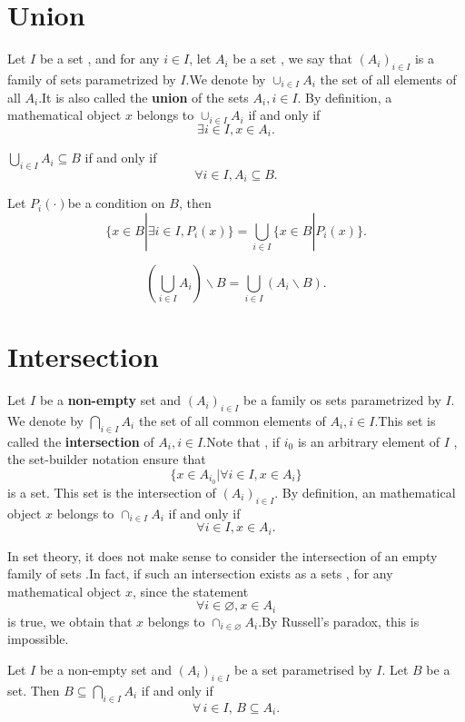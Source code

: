 \documentclass{book}
\numberwithin{equation}{section}
\begin{document}
\section{Union}
\begin{definitionenv}
    Let $I$ be a set , and for any $i \in I$,  let $A_i$ be a set , we say that $(A_i)_{i\in I}$ is a family of sets parametrized by $I$.We denote by $\cup_{i \in I}A_i$ the set of all elements of all $A_i$.It is also called the \textbf{union} of the sets $A_i, i\in I$. By definition, a mathematical object $x$ belongs to $\cup_{i \in I}A_i$ if and only if $$\exists i\in I, x\in A_i.$$ 
\end{definitionenv}
\begin{propositionenv}
    $ \displaystyle \bigcup_{i\in I}A_i\subseteq B$ if and only if $$\forall i\in I, A_i\subseteq B.$$
\end{propositionenv}
\begin{corollaryenv}\label{corollary2.6.1}
    Let $P_i(\cdot) $be a condition on $B$, then
    $$\{x\in B|\exists i\in I, P_i(x)\}=\bigcup_{i\in I}\{x\in B|P_i(x)\}.$$
\end{corollaryenv}
\begin{propositionenv}
    $$\left( \bigcup _{i\in I}A_i\right)\backslash B=\bigcup_{i\in I}\left( A_i\backslash B\right).$$
\end{propositionenv}
\section{Intersection}
\begin{definitionenv}
    Let $I$ be a \textbf{non-empty} set and $(A_i)_{i\in I} $ be a family os sets parametrized by $I$. We denote by $\displaystyle \bigcap_{i\in I}A_i $ the set of all common elements of $A_i, i\in I$.This set is called the \textbf{intersection} of $A_i, i\in I$.Note that , if $i_0$ is an arbitrary element of $I$ , the set-builder notation ensure that
    $$\{x\in A_{i_0}|\forall i\in I, x\in A_i\}$$ is a set. This set is the intersection of $(A_i)_{i\in I}$.
    \newline
    By definition,  an mathematical object $x$ belongs to $\cap _{i\in I}A_i$ if and only if $$\forall i\in I , x\in A_i.$$
    
\end{definitionenv}
\begin{remark}
    In set theory,  it does not make sense to consider the intersection of an empty family of sets .In fact,  if such an intersection exists as a sets , for any mathematical object $x$,  since the statement $$\forall i\in \varnothing, x \in A_i$$is true,  we obtain that $x$ belongs to $\cap_{i\in \varnothing}A_i$.By Russell's paradox,  this is impossible.
\end{remark}
\begin{propositionenv}\label{proposition2.7.1}
Let \( I \) be a non-empty set and \( (A_i)_{i \in I} \) be a set parametrised by \( I \). Let \( B \) be a set. Then \( B \subseteq \bigcap_{i \in I} A_i \) if and only if
\[
\forall\,  i \in I, \,  B \subseteq A_i.
\]
\end{propositionenv}
\end{document}
